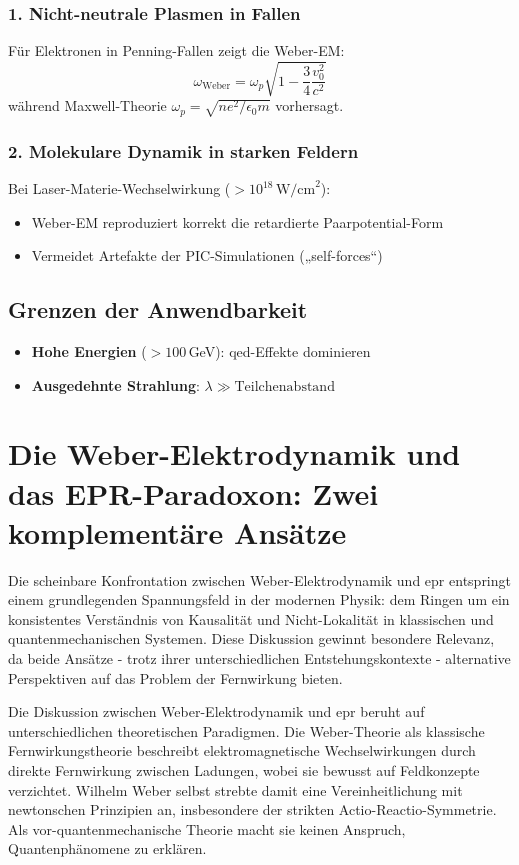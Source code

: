 \subsubsection{1. Nicht-neutrale Plasmen in Fallen}
Für Elektronen in Penning-Fallen zeigt die Weber-EM:
\begin{equation}
\omega_{\text{Weber}} = \omega_p\sqrt{1 - \frac{3}{4}\frac{v_0^2}{c^2}}
\end{equation}
während Maxwell-Theorie $\omega_p = \sqrt{ne^2/\epsilon_0 m}$ vorhersagt.

\subsubsection{2. Molekulare Dynamik in starken Feldern}
Bei Laser-Materie-Wechselwirkung ($>10^{18}\,\text{W/cm}^2$):
\begin{itemize}
\item Weber-EM reproduziert korrekt die retardierte Paarpotential-Form
\item Vermeidet Artefakte der PIC-Simulationen („self-forces“)
\end{itemize}

\subsection{Grenzen der Anwendbarkeit}
\begin{itemize}
\item \textbf{Hohe Energien} ($>100$\,GeV): \gls{qed}-Effekte dominieren
\item \textbf{Ausgedehnte Strahlung}:  $\lambda \gg \text{Teilchenabstand}$
\end{itemize}

\section{Die Weber-Elektrodynamik und das EPR-Paradoxon: Zwei komplementäre Ansätze}
Die scheinbare Konfrontation zwischen Weber-Elektrodynamik und \gls{epr} entspringt einem grundlegenden Spannungsfeld in der modernen Physik: dem Ringen um ein konsistentes
Verständnis von Kausalität und Nicht-Lokalität in klassischen und quantenmechanischen Systemen. Diese Diskussion gewinnt besondere Relevanz, da beide Ansätze - trotz ihrer
unterschiedlichen Entstehungskontexte - alternative Perspektiven auf das Problem der Fernwirkung bieten.

Die Diskussion zwischen Weber-Elektrodynamik und \gls{epr} beruht auf unterschiedlichen theoretischen Paradigmen. Die Weber-Theorie als klassische Fernwirkungstheorie beschreibt
elektromagnetische Wechselwirkungen durch direkte Fernwirkung zwischen Ladungen, wobei sie bewusst auf Feldkonzepte verzichtet. Wilhelm Weber selbst strebte damit eine Vereinheitlichung
mit newtonschen Prinzipien an, insbesondere der strikten Actio-Reactio-Symmetrie. Als vor-quantenmechanische Theorie macht sie keinen Anspruch, Quantenphänomene zu erklären.

